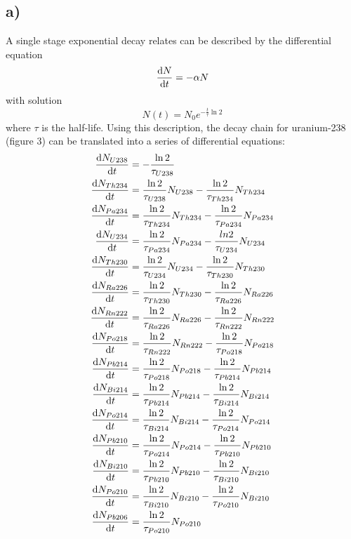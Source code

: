 \documentclass{article}
\newcommand{\<}[1]{\left\langle #1 \right\rangle }
\begin{document}
\section{}
\subsection{a)}
A single stage exponential decay relates can be described by the differential equation
\[\dv{N}{t} = -\alpha N\]
with solution
\[N(t) = N_0 e^{-\frac{t}{\tau}\ln{2}}\]
where $\tau$ is the half-life. Using this description, the decay chain for uranium-238 (figure 3) can be translated into a series of differential equations:
\begin{align}
	\dv{N_{U238}}{t} &= -\frac{\ln{2}}{\tau_{U238}}\\
	\dv{N_{Th234}}{t} &= \frac{\ln{2}}{\tau_{U238}} N_{U238} - \frac{\ln{2}}{\tau_{Th234}} N_{Th234}\\
	\dv{N_{Pa234}}{t} &= \frac{\ln{2}}{\tau_{Th234}} N_{Th234} - \frac{\ln{2}}{\tau_{Pa234}} N_{{Pa234}}\\
	\dv{N_{U234}}{t} &= \frac{\ln{2}}{\tau_{Pa234}} N_{Pa234} - \frac{ln2}{\tau_{U234}}N_{U234}\\
	\dv{N_{Th230}}{t} &= \frac{\ln{2}}{\tau_{U234}}N_{U234} - \frac{\ln{2}}{\tau_{Th230}}N_{Th230}\\
	\dv{N_{Ra226}}{t} &= \frac{\ln{2}}{\tau_{Th230}}N_{Th230} - \frac{\ln{2}}{\tau_{Ra226}} N_{Ra226}\\
	\dv{N_{Rn222}}{t} &= \frac{\ln{2}}{\tau_{Ra226}}N_{Ra226} - \frac{\ln{2}}{\tau_{Rn222}}N_{Rn222}\\
	\dv{N_{Po218}}{t} &= \frac{\ln{2}}{\tau_{Rn222}}N_{Rn222} - \frac{\ln{2}}{\tau_{Po218}}N_{Po218}\\
	\dv{N_{Pb214}}{t} &= \frac{\ln{2}}{\tau_{Po218}}N_{Po218} - \frac{\ln{2}}{\tau_{Pb214}}N_{Pb214}\\
	\dv{N_{Bi214}}{t} &= \frac{\ln{2}}{\tau_{Pb214}}N_{Pb214} - \frac{\ln{2}}{\tau_{Bi214}}N_{Bi214}\\
	\dv{N_{Po214}}{t} &= \frac{\ln{2}}{\tau_{Bi214}}N_{Bi214} - \frac{\ln{2}}{\tau_{Po214}}N_{Po214}\\
	\dv{N_{Pb210}}{t} &= \frac{\ln{2}}{\tau_{Po214}}N_{Po214} - \frac{\ln{2}}{\tau_{Pb210}}N_{Pb210}\\
	\dv{N_{Bi210}}{t} &= \frac{\ln{2}}{\tau_{Pb210}}N_{Pb210} - \frac{\ln{2}}{\tau_{Bi210}}N_{Bi210}\\
	\dv{N_{Po210}}{t} &= \frac{\ln{2}}{\tau_{Bi210}}N_{Bi210} - \frac{\ln{2}}{\tau_{Po210}}N_{Bi210}\\
	\dv{N_{Pb206}}{t} & = \frac{\ln{2}}{\tau_{Po210}}N_{Po210}
\end{align}
\end{document}
